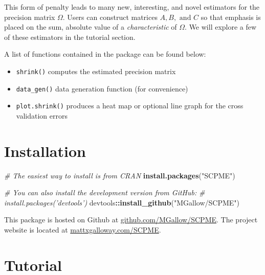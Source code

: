 \documentclass[11pt,]{report}
\newenvironment{Shaded}{\begin{snugshade}}{\end{snugshade}}
\newcommand{\CommentTok}[1]{\textcolor[rgb]{0.56,0.35,0.01}{\textit{#1}}}
\newcommand{\KeywordTok}[1]{\textcolor[rgb]{0.13,0.29,0.53}{\textbf{#1}}}
\newcommand{\NormalTok}[1]{#1}
\newcommand{\OperatorTok}[1]{\textcolor[rgb]{0.81,0.36,0.00}{\textbf{#1}}}
\newcommand{\StringTok}[1]{\textcolor[rgb]{0.31,0.60,0.02}{#1}}
\begin{document}
This form of penalty leads to many new, interesting, and novel estimators for the precision matrix \(\Omega\). Users can construct matrices \(A, B, \mbox{ and } C\) so that emphasis is placed on the sum, absolute value of a \emph{characteristic} of \(\Omega\). We will explore a few of these estimators in the tutorial section.

A list of functions contained in the package can be found below:

\begin{itemize}
\item
  \texttt{shrink()} computes the estimated precision matrix
\item
  \texttt{data\_gen()} data generation function (for convenience)
\item
  \texttt{plot.shrink()} produces a heat map or optional line graph for the cross validation errors
\end{itemize}

\hypertarget{installation-1}{%
\section{Installation}\label{installation-1}}

\begin{Shaded}
\begin{Highlighting}[]
\CommentTok{# The easiest way to install is from CRAN}
\KeywordTok{install.packages}\NormalTok{(}\StringTok{"SCPME"}\NormalTok{)}

\CommentTok{# You can also install the development version from GitHub:}
\CommentTok{# install.packages('devtools')}
\NormalTok{devtools}\OperatorTok{::}\KeywordTok{install_github}\NormalTok{(}\StringTok{"MGallow/SCPME"}\NormalTok{)}
\end{Highlighting}
\end{Shaded}

\vspace{0.5cm}

This package is hosted on Github at \href{https://github.com/MGallow/SCPME}{github.com/MGallow/SCPME}. The project website is located at \href{http://mattxgalloway.com/SCPME/}{mattxgalloway.com/SCPME}.

\hypertarget{tutorial-1}{%
\section{Tutorial}\label{tutorial-1}}
\end{document}

